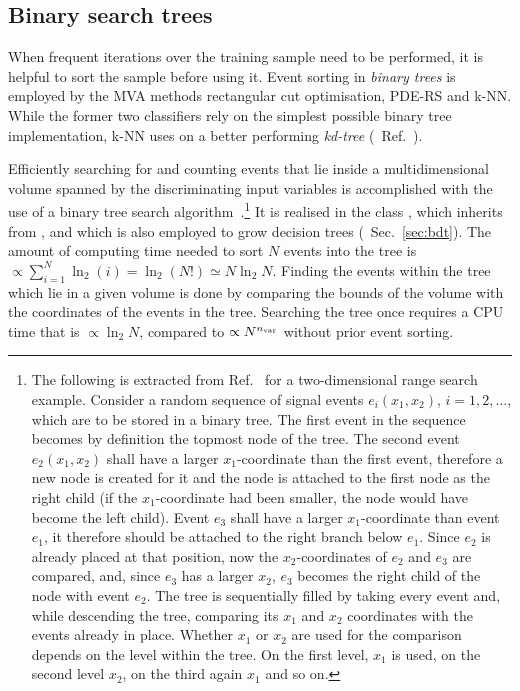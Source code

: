 \subsection{Binary search trees} 
\label{sec:binaryTrees}

When frequent iterations over the training sample need to be performed, it is helpful 
to sort the sample before using it. Event sorting in {\em binary trees} is employed 
by the MVA methods rectangular cut optimisation,  
PDE-RS and k-NN. While the former two classifiers rely on 
the simplest possible binary tree implementation, k-NN uses on a better performing 
{\em kd-tree} (\cf\  Ref.~\cite{kd-tree}).

Efficiently searching for and counting events that lie inside a multidimensional
volume spanned by the discriminating input variables is accomplished with the use of a 
binary tree search algorithm~\cite{BinaryTree}.\footnote
{
   The following is extracted from Ref.~\cite{CarliKoblitz} for a two-dimensional 
   range search example.
   Consider a random sequence of signal events $e_i(x_1, x_2)$, $i = 1,2,\dots$, 
   which are to be stored in a binary tree. The first event in the sequence 
   becomes by definition the topmost node of the tree. The second event 
   $e_2(x_1, x_2)$ shall have a larger $x_1$-coordinate than the first event, 
   therefore a new node is created for it and the node is attached to the first
   node as the right child (if the $x_1$-coordinate had been smaller, the 
   node would have become the left child). Event $e_3$ shall have a larger 
   $x_1$-coordinate than event $e_1$, it therefore should be attached to 
   the right branch below $e_1$. Since $e_2$ is already placed at that 
   position, now the $x_2$-coordinates of $e_2$ and $e_3$ are compared, and,
   since $e_3$ has a larger $x_2$, $e_3$ becomes the right child of the node 
   with event $e_2$.
   The tree is sequentially filled by taking every event and, while 
   descending the tree, comparing its $x_1$ and $x_2$ coordinates with 
   the events already in place. Whether $x_1$ or $x_2$ are used for the 
   comparison depends on the level within the tree. On the first level, 
   $x_1$ is used, on the second level $x_2$, on the third again $x_1$ 
   and so on.
}
It is realised in the class , which 
inherits from , and which is also employed to grow decision 
trees (\cf\  Sec.~\ref{sec:bdt}). The amount of computing time needed to 
sort $N$ events into the tree is~\cite{CarliKoblitz} 
$\propto\sum_{i=1}^N\ln_2(i)=\ln_2(N!)\simeq N\ln_2N$. 
Finding the events within the tree which lie in a given volume is done 
by comparing the bounds of the volume with the coordinates of the events 
in the tree. Searching the tree once requires a CPU time that is
$\propto\ln_2N$, compared to $\propto N^{n_\text{var}}$ without prior event sorting.

